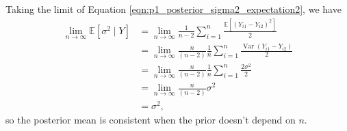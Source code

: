 \documentclass[letterpaper,11pt]{article}
\begin{document}
\begin{enumerate}
\begin{enumerate}
\begin{description}
        Taking the limit of Equation \ref{eqn:p1_posterior_sigma2_expectation2},
        we have
        \begin{align}
          \lim_{n\rightarrow\infty}\mathbb{E}\left[\sigma^2 \mid Y\right]
          &= \lim_{n\rightarrow\infty} \frac{1}{n-2}\sum_{i=1}^n \frac{\mathbb{E}\left[
            \left(Y_{i1} - Y_{i2}\right)^2\right]}{2}
            \nonumber\\
          &= \lim_{n\rightarrow\infty} \frac{n}{\left(n-2\right)}
            \frac{1}{n}\sum_{i=1}^n \frac{\operatorname{Var}\left(Y_{i1} - Y_{i2}\right)}{2} \nonumber\\
          &= \lim_{n\rightarrow\infty} \frac{n}{\left(n-2\right)}
            \frac{1}{n}\sum_{i=1}^n \frac{2\sigma^2}{2} \nonumber\\
          &= \lim_{n\rightarrow\infty} \frac{n}{\left(n-2\right)}\sigma^2 \nonumber\\
          &= \sigma^2,
        \end{align}
        so the posterior mean is consistent when the prior doesn't depend on $n$.
      \end{description}
    \end{enumerate}
\end{enumerate}
\end{document}
